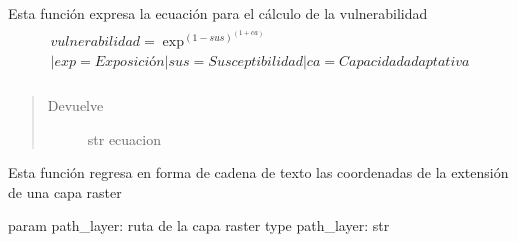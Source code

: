 \documentclass[letterpaper,10pt,spanish]{sphinxmanual}
\begin{document}

\begin{fulllineitems}
\label{\detokenize{analisis:sensibilidad_por_remocion_capas.ecuacion_vulnerabilidad}}
Esta función expresa la ecuación para el cálculo de la vulnerabilidad
\begin{align*}\!\begin{aligned}
vulnerabilidad = \exp^{( 1 - sus)^{(1 + ca)}}\\
| exp = Exposición
| sus = Susceptibilidad
| ca = Capacidad adaptativa\\
\end{aligned}\end{align*}\begin{quote}\begin{description}
\item[{Devuelve}] \leavevmode
str ecuacion

\end{description}\end{quote}

\end{fulllineitems}


\begin{fulllineitems}
\label{\detokenize{analisis:sensibilidad_por_remocion_capas.get_region}}
Esta función regresa en forma de cadena de texto
las coordenadas de la extensión de una capa raster

param path\_layer: ruta de la capa raster
type path\_layer: str

\end{fulllineitems}

\end{document}
